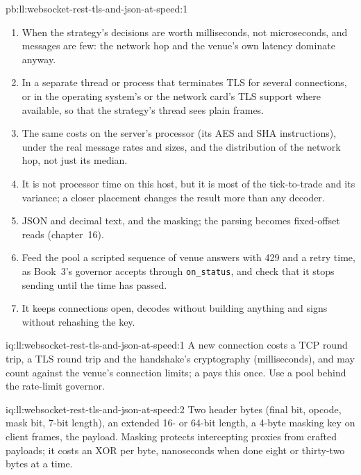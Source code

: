 \begin{solution}{pb:ll:websocket-rest-tls-and-json-at-speed:1}
\begin{enumerate}
network path itself.
\item When the strategy's decisions are worth milliseconds, not microseconds, and messages are few: the network hop and the
venue's own latency dominate anyway.
\item In a separate thread or process that terminates TLS for several connections, or in the operating system's or the
network card's TLS support where available, so that the strategy's thread sees plain frames.
\item The same costs on the server's processor (its AES and SHA instructions), under the real message rates and sizes, and
the distribution of the network hop, not just its median.
\item It is not processor time on this host, but it is most of the tick-to-trade and its variance; a closer placement changes
the result more than any decoder.
\item JSON and decimal text, and the masking; the parsing becomes fixed-offset reads (chapter~16).
\item Feed the pool a scripted sequence of venue answers with 429 and a retry time, as Book~3's governor accepts through
\texttt{on\_status}, and check that it stops sending until the time has passed.
\item It keeps connections open, decodes without building anything and signs without rehashing the key.
\end{enumerate}
\end{solution}

\begin{solution}{iq:ll:websocket-rest-tls-and-json-at-speed:1}
A new connection costs a TCP round trip, a TLS round trip and the handshake's cryptography (milliseconds), and may count
against the venue's connection limits; a  pays this once. Use a pool behind the rate-limit governor.
\end{solution}

\begin{solution}{iq:ll:websocket-rest-tls-and-json-at-speed:2}
Two header bytes (final bit, opcode, mask bit, 7-bit length), an extended 16- or 64-bit length, a 4-byte masking key on client
frames, the payload. Masking protects intercepting proxies from crafted payloads; it costs an XOR per byte, nanoseconds when
done eight or thirty-two bytes at a time.
\end{solution}

